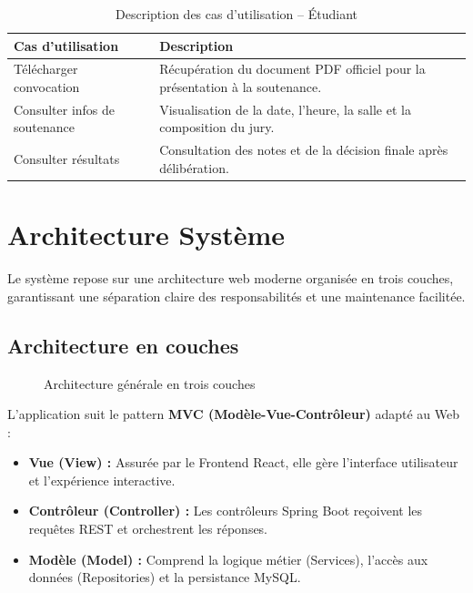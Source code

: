 \documentclass[12pt,a4paper]{article}
\begin{document}
\begin{table}[H]
    \centering
    \small
    \begin{tabular}{lp{10cm}}
        \toprule
        \rowcolor{primary!10}
        \textbf{Cas d'utilisation}    & \textbf{Description}                                                        \\
        \midrule
        Télécharger convocation       & Récupération du document PDF officiel pour la présentation à la soutenance. \\
        \addlinespace
        Consulter infos de soutenance & Visualisation de la date, l'heure, la salle et la composition du jury.      \\
        \addlinespace
        Consulter résultats           & Consultation des notes et de la décision finale après délibération.         \\
        \bottomrule
    \end{tabular}
    \caption{Description des cas d'utilisation -- Étudiant}
\end{table}

\newpage
\section{Architecture Système}

Le système repose sur une architecture web moderne organisée en trois couches, garantissant une séparation claire des responsabilités et une maintenance facilitée.

\subsection{Architecture en couches}

\begin{figure}[H]
    \centering
    \caption{Architecture générale en trois couches}
\end{figure}

L'application suit le pattern \textbf{MVC (Modèle-Vue-Contrôleur)} adapté au Web :
\begin{itemize}
    \item \textbf{Vue (View) :} Assurée par le Frontend React, elle gère l'interface utilisateur et l'expérience interactive.
    \item \textbf{Contrôleur (Controller) :} Les contrôleurs Spring Boot reçoivent les requêtes REST et orchestrent les réponses.
    \item \textbf{Modèle (Model) :} Comprend la logique métier (Services), l'accès aux données (Repositories) et la persistance MySQL.
\end{itemize}
\end{document}
